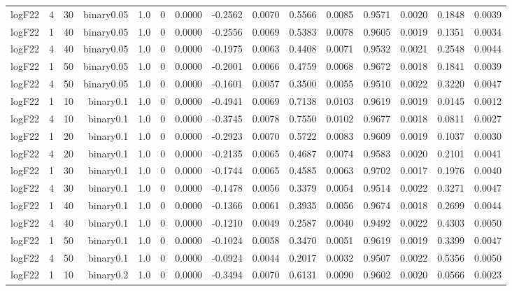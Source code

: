 \begin{longtable}{rrrrrrrrrrrrrrr}
  logF22 & 4 & 30 & binary0.05 & 1.0 & 0 & 0.0000 & -0.2562 & 0.0070 & 0.5566 & 0.0085 & 0.9571 & 0.0020 & 0.1848 & 0.0039 \\ 
  logF22 & 1 & 40 & binary0.05 & 1.0 & 0 & 0.0000 & -0.2556 & 0.0069 & 0.5383 & 0.0078 & 0.9605 & 0.0019 & 0.1351 & 0.0034 \\ 
  logF22 & 4 & 40 & binary0.05 & 1.0 & 0 & 0.0000 & -0.1975 & 0.0063 & 0.4408 & 0.0071 & 0.9532 & 0.0021 & 0.2548 & 0.0044 \\ 
  logF22 & 1 & 50 & binary0.05 & 1.0 & 0 & 0.0000 & -0.2001 & 0.0066 & 0.4759 & 0.0068 & 0.9672 & 0.0018 & 0.1841 & 0.0039 \\ 
  logF22 & 4 & 50 & binary0.05 & 1.0 & 0 & 0.0000 & -0.1601 & 0.0057 & 0.3500 & 0.0055 & 0.9510 & 0.0022 & 0.3220 & 0.0047 \\ 
  logF22 & 1 & 10 & binary0.1 & 1.0 & 0 & 0.0000 & -0.4941 & 0.0069 & 0.7138 & 0.0103 & 0.9619 & 0.0019 & 0.0145 & 0.0012 \\ 
  logF22 & 4 & 10 & binary0.1 & 1.0 & 0 & 0.0000 & -0.3745 & 0.0078 & 0.7550 & 0.0102 & 0.9677 & 0.0018 & 0.0811 & 0.0027 \\ 
  logF22 & 1 & 20 & binary0.1 & 1.0 & 0 & 0.0000 & -0.2923 & 0.0070 & 0.5722 & 0.0083 & 0.9609 & 0.0019 & 0.1037 & 0.0030 \\ 
  logF22 & 4 & 20 & binary0.1 & 1.0 & 0 & 0.0000 & -0.2135 & 0.0065 & 0.4687 & 0.0074 & 0.9583 & 0.0020 & 0.2101 & 0.0041 \\ 
  logF22 & 1 & 30 & binary0.1 & 1.0 & 0 & 0.0000 & -0.1744 & 0.0065 & 0.4585 & 0.0063 & 0.9702 & 0.0017 & 0.1976 & 0.0040 \\ 
  logF22 & 4 & 30 & binary0.1 & 1.0 & 0 & 0.0000 & -0.1478 & 0.0056 & 0.3379 & 0.0054 & 0.9514 & 0.0022 & 0.3271 & 0.0047 \\ 
  logF22 & 1 & 40 & binary0.1 & 1.0 & 0 & 0.0000 & -0.1366 & 0.0061 & 0.3935 & 0.0056 & 0.9674 & 0.0018 & 0.2699 & 0.0044 \\ 
  logF22 & 4 & 40 & binary0.1 & 1.0 & 0 & 0.0000 & -0.1210 & 0.0049 & 0.2587 & 0.0040 & 0.9492 & 0.0022 & 0.4303 & 0.0050 \\ 
  logF22 & 1 & 50 & binary0.1 & 1.0 & 0 & 0.0000 & -0.1024 & 0.0058 & 0.3470 & 0.0051 & 0.9619 & 0.0019 & 0.3399 & 0.0047 \\ 
  logF22 & 4 & 50 & binary0.1 & 1.0 & 0 & 0.0000 & -0.0924 & 0.0044 & 0.2017 & 0.0032 & 0.9507 & 0.0022 & 0.5356 & 0.0050 \\ 
  logF22 & 1 & 10 & binary0.2 & 1.0 & 0 & 0.0000 & -0.3494 & 0.0070 & 0.6131 & 0.0090 & 0.9602 & 0.0020 & 0.0566 & 0.0023 \\ 

\end{longtable}
